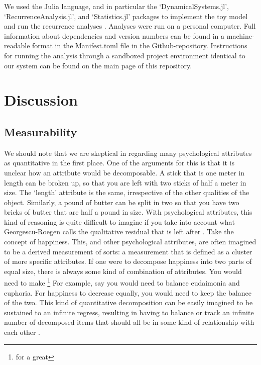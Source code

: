 \documentclass[utf8]{FrontiersinVancouver}
\begin{document}
We used the Julia language, and in particular the `DynamicalSystems.jl', `RecurrenceAnalysis.jl', and `Statistics.jl' packages to implement the toy model and run the recurrence analyses \citep{bezanson2017julia, Datseris2018, DatserisParlitz2022}. Analyses were run on a personal computer. Full information about dependencies and version numbers can be found in a machine-readable format in the Manifest.toml file in the Github-repository. Instructions for running the analysis through a sandboxed project environment identical to our system can be found on the main page of this repository.


\section{Discussion}

\subsection{Measurability}


We should note that we are skeptical in regarding many psychological attributes as quantitative in the first place. One of the arguments for this is that it is unclear how an attribute would be decomposable. A stick that is one meter in length can be broken up, so that you are left with two sticks of half a meter in size. The `length' attribute is the same, irrespective of the other qualities of the object. Similarly, a pound of butter can be split in two so that you have two bricks of butter that are half a pound in size. With psychological attributes, this kind of reasoning is quite difficult to imagine if you take into account what Georgescu-Roegen calls the qualitative residual that is left after . Take the concept of happiness. This, and other psychological attributes, are often imagined to be a derived measurement of sorts: a measurement that is defined as a cluster of more specific attributes. If one were to decompose happiness into two parts of equal size, there is always some kind of combination of attributes. You would need to make  \footnote{for a great } For example, say you would need to balance eudaimonia and euphoria. For happiness to decrease equally, you would need to keep the balance of the two. This kind of quantitative decomposition can be easily imagined to be sustained to an infinite regress, resulting in having to balance or track an infinite number of decomposed items that should all be in some kind of relationship with each other . 
\end{document}
